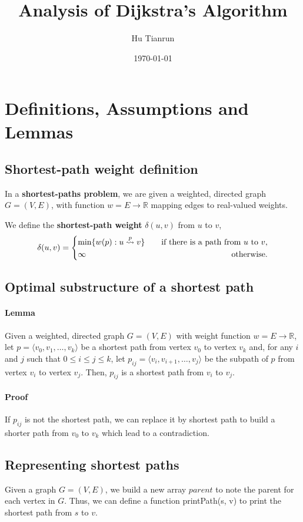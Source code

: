 \documentclass{article}
\title{Analysis of Dijkstra's Algorithm}
\author{Hu Tianrun}
\date{\today}
\begin{document}
	\maketitle
	\newpage
	\section{Definitions, Assumptions and Lemmas}
	\subsection{Shortest-path weight definition}
	In a \textbf{shortest-paths problem}, we are given a weighted, directed graph $ G = (V, E) $, with function $ w = E \rightarrow \mathbb{R} $ mapping edges to real-valued weights.
	
	We define the \textbf{shortest-path weight} $ \delta(u, v) $ from $ u $ to $ v $,
	\[ \delta(u,v) = \left\{\begin{aligned}
			&\text{min}\{w(p):u \stackrel{p}{\rightsquigarrow} v \}\quad &\text{if there is a path from $ u $ to $ v $},\\
			&\infty &\text{otherwise}.
		\end{aligned}
		\right. \]
	\subsection{Optimal substructure of a shortest path}
	\paragraph{Lemma} Given a weighted, directed graph $ G = (V, E) $ with weight function $ w = E \rightarrow \mathbb{R} $, let $ p = \langle v_0, v_1, \dots, v_k \rangle $ be a shortest path from vertex $ v_0 $ to vertex $ v_k $ and, for any $ i $ and $ j $ such that $ 0 \leq i \leq j \leq k $, let $ p_{ij} = \langle v_i, v_{i+1}, \dots, v_j\rangle $ be the subpath of $ p $ from vertex $ v_i $ to vertex $ v_j $. Then, $ p_{ij} $ is a shortest path from $ v_i $ to $ v_j $.
	\paragraph{Proof} If $ p_{ij} $ is not the shortest path, we can replace it by shortest path to build a shorter path from $ v_0 $ to $ v_k $ which lead to a contradiction.
	\subsection{Representing shortest paths}
	Given a graph $ G = (V, E) $, we build a new array $ parent $ to note the parent for each vertex in $ G $. Thus, we can define a function printPath(s, v) to print the shortest path from $ s $ to $ v $.
	
	
\end{document}

